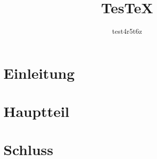 \documentclass[12pt,a4paper]{scrartcl}
\author{test4r5t6z}
\title{TesTeX}
\begin{document}
 
\maketitle

\tableofcontents



\section{Einleitung}



\section{Hauptteil}



\section{Schluss}
\end{document}
